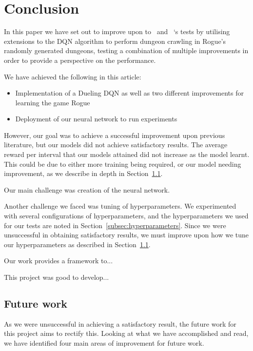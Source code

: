 \documentclass[12pt,a4paper]{article}
\begin{document}
    \section{Conclusion}\label{sec:conclusion}
    In this paper we have set out to improve upon to~\citet{asperti18} and ~\citet{kanagawa19}`s tests by utilising extensions to the DQN algorithm
    to perform dungeon crawling in Rogue's randomly generated dungeons, testing a combination of multiple improvements in order to
    provide a perspective on the performance.

    We have achieved the following in this article:
    \begin{itemize}
        \item Implementation of a Dueling DQN as well as two different improvements for learning the game Rogue
        \item Deployment of our neural network to run experiments
    \end{itemize}


    However, our goal was to achieve a successful improvement upon previous literature, but our models did not achieve satisfactory results.
    The average reward per interval that our models attained did not increase as the model learnt.
    This could be due to either more training being required, or our model needing improvement, as we describe in depth in Section~\ref{subsec:future-work}.

    Our main challenge was creation of the neural network.


    Another challenge we faced was tuning of hyperparameters.
    We experimented with several configurations of hyperparameters, and the hyperparameters we used for our tests are noted in Section~\ref{subsec:hyperparameters}.
    Since we were unsuccessful in obtaining satisfactory results, we must improve upon how we tune our hyperparameters as described in Section~\ref{subsec:future-work}.

    Our work provides a framework to...

    This project was good to develop...


    
    \subsection{Future work}\label{subsec:future-work}
    As we were unsuccessful in achieving a satisfactory result, the future work for this project aims to rectify this.
    Looking at what we have accomplished and read, we have identified four main areas of improvement for future work.
\end{document}
